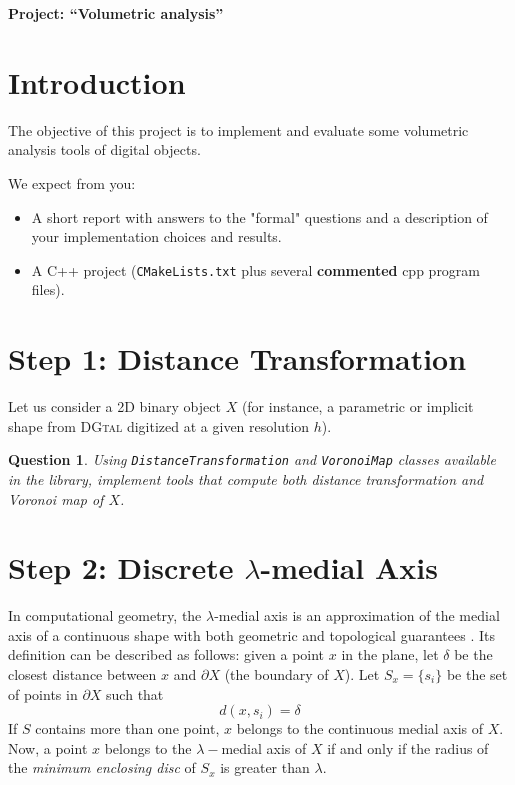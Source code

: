 \documentclass[a4paper, 11pt]{article}
\title{}
\author{}
\date{}
\newtheorem{qu}{Question}
\begin{document}
\begin{center}
	\LARGE \textbf{Project: ``Volumetric analysis''}
\end{center}

\section*{Introduction} 

The objective of this project is to implement and evaluate some
volumetric analysis tools of digital objects. 

We expect from you:
\begin{itemize}
\item A short report with answers to the "formal" questions and a
  description of  your implementation choices and results.
\item A C++ project (\texttt{CMakeLists.txt} plus several
  \textbf{commented} cpp program files).
\end{itemize}


\section{Step 1: Distance Transformation}

Let us consider a 2D binary object $X$ (for instance, a parametric or implicit
shape from \textsc{DGtal} digitized at a given resolution $h$). 

\begin{qu}
  Using \texttt{DistanceTransformation} and \texttt{VoronoiMap}
  classes available in the library, implement tools that compute both
  distance transformation and Voronoi map of $X$.
\end{qu}

\section{Step 2: Discrete $\lambda$-medial Axis}

In computational geometry, the $\lambda$-medial axis is an
approximation of the medial axis of a continuous shape with both
geometric and topological guarantees \cite{Chazal2005}. Its definition
can be described as follows: given a point $x$ in the plane, let
$\delta$ be the closest distance between $x$ and $\partial X$ (the
boundary of $X$). Let $S_x=\{s_i\}$ be the set of points in $\partial
X$ such that
\begin{equation}
  d(x,s_i)=\delta
\end{equation}
If $S$ contains more than one point, $x$ belongs to the continuous
medial axis of $X$.  Now, a point $x$ belongs to the $\lambda-$medial
axis of $X$ if and only if the radius of the \emph{minimum enclosing
  disc} of $S_x$ is greater than $\lambda$.
\end{document}
